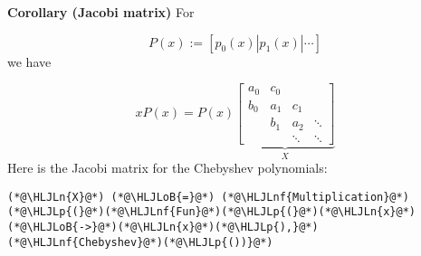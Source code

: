 \documentclass[12pt,landscape]{article}
\newcommand{\HLJLn}[1]{#1}
\newcommand{\HLJLnf}[1]{\textcolor[RGB]{66,102,213}{#1}}
\newcommand{\HLJLoB}[1]{\textcolor[RGB]{102,102,102}{\textbf{#1}}}
\newcommand{\HLJLp}[1]{#1}
\begin{document}
{\textbf{Corollary (Jacobi matrix)} For

\[
P(x) := [p_0(x) | p_1(x) | \ensuremath{\cdots}]
\]
we have

\[
x P(x) = P(x) \underbrace{\begin{bmatrix} a_0 & c_0 \\
                                                        b_0 & a_1 & c_1\\
                                                        & b_1 & a_2 & \ensuremath{\ddots} \\
                                                        && \ensuremath{\ddots} & \ensuremath{\ddots}
                                                        \end{bmatrix}}_X
\]
Here is the Jacobi matrix for the Chebyshev polynomials:


\begin{lstlisting}
(*@\HLJLn{X}@*) (*@\HLJLoB{=}@*) (*@\HLJLnf{Multiplication}@*)(*@\HLJLp{(}@*)(*@\HLJLnf{Fun}@*)(*@\HLJLp{(}@*)(*@\HLJLn{x}@*)(*@\HLJLoB{->}@*)(*@\HLJLn{x}@*)(*@\HLJLp{),}@*)(*@\HLJLnf{Chebyshev}@*)(*@\HLJLp{())}@*)
\end{lstlisting}

}
\end{document}
